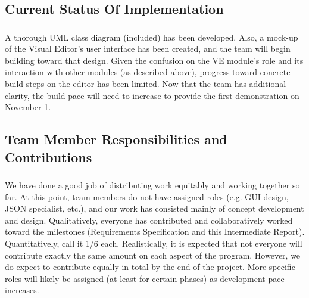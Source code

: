 \documentclass{llncs}
\begin{document}
\subsection{Current Status Of Implementation}
\subsubsection{}
A thorough UML class diagram (included) has been developed.  Also, a mock-up of the Visual Editor’s user interface has been created, and the team will begin building toward that design. Given the confusion on the VE module’s role and its interaction with other modules (as described above), progress toward concrete build steps on the editor has been limited.  Now that the team has additional clarity, the build pace will need to increase to provide the first demonstration on November 1.  

\subsection{Team Member Responsibilities and Contributions}
\subsubsection{}We have done a good job of distributing work equitably and working together so far.  At this point, team members do not have assigned roles (e.g. GUI design, JSON specialist, etc.), and our work has consisted mainly of concept development and design.  Qualitatively, everyone has contributed and collaboratively worked toward the milestones (Requirements Specification and this Intermediate Report).  Quantitatively, call it 1/6 each.  Realistically, it is expected that not everyone will contribute exactly the same amount on each aspect of the program.  However, we do expect to contribute equally in total by the end of the project.  More specific roles will likely be assigned (at least for certain phases) as development pace increases.







%

%
%

\end{document}
